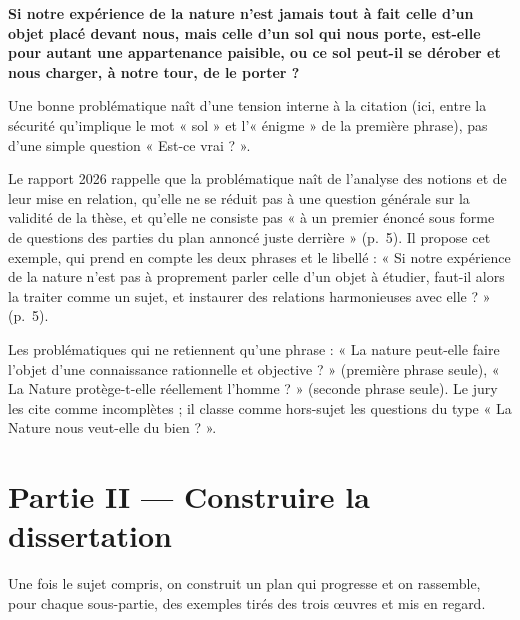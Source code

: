 \documentclass[11pt,a4paper]{article}
\begin{document}
\textbf{Si notre expérience de la nature n'est jamais tout à fait celle d'un objet placé devant nous, mais celle d'un sol qui nous porte, est-elle pour autant une appartenance paisible, ou ce sol peut-il se dérober et nous charger, à notre tour, de le porter ?}

\begin{methode}

Une bonne problématique naît d'une tension interne à la citation (ici, entre la sécurité qu'implique le mot « sol » et l'« énigme » de la première phrase), pas d'une simple question « Est-ce vrai ? ».

\end{methode}

\begin{jury}

Le rapport 2026 rappelle que la problématique naît de l'analyse des notions et de leur mise en relation, qu'elle ne se réduit pas à une question générale sur la validité de la thèse, et qu'elle ne consiste pas « à un premier énoncé sous forme de questions des parties du plan annoncé juste derrière » (p.~5). Il propose cet exemple, qui prend en compte les deux phrases et le libellé : « Si notre expérience de la nature n'est pas à proprement parler celle d'un objet à étudier, faut-il alors la traiter comme un sujet, et instaurer des relations harmonieuses avec elle ? » (p.~5).

\end{jury}

\begin{piege}

Les problématiques qui ne retiennent qu'une phrase : « La nature peut-elle faire l'objet d'une connaissance rationnelle et objective ? » (première phrase seule), « La Nature protège-t-elle réellement l'homme ? » (seconde phrase seule). Le jury les cite comme incomplètes ; il classe comme hors-sujet les questions du type « La Nature nous veut-elle du bien ? ».

\end{piege}

\hypertarget{partie-ii-construire-la-dissertation}{%
\section{Partie II --- Construire la dissertation}\label{partie-ii-construire-la-dissertation}}

Une fois le sujet compris, on construit un plan qui progresse et on rassemble, pour chaque sous-partie, des exemples tirés des trois œuvres et mis en regard.
\end{document}
